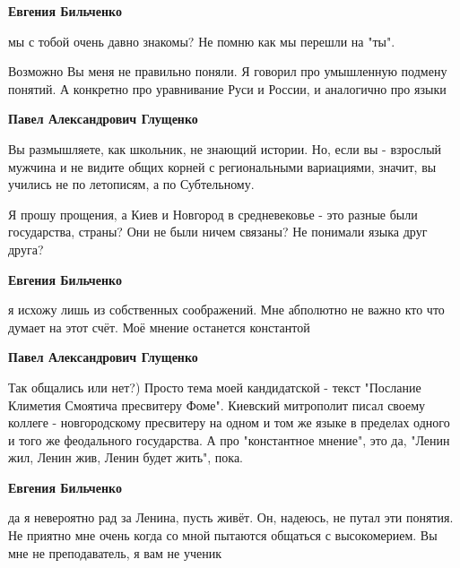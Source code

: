 \begin{itemize}
\begin{itemize}
\textbf{Евгения Бильченко} 

мы с тобой очень давно знакомы? Не помню как мы перешли на "ты".

Возможно Вы меня не правильно поняли. Я говорил про умышленную подмену понятий.
А конкретно про уравнивание Руси и России, и аналогично про языки



\textbf{Павел Александрович Глущенко} 

Вы размышляете, как школьник, не знающий
истории. Но, если вы - взрослый мужчина и не видите общих корней с
региональными вариациями, значит, вы учились не по летописям, а по Субтельному.


Я прошу прощения, а Киев и Новгород в средневековье - это разные были
государства, страны? Они не были ничем связаны? Не понимали языка друг друга?


\textbf{Евгения Бильченко} 

я исхожу лишь из собственных соображений. Мне
абполютно не важно кто что думает на этот счёт. Моё мнение останется константой



\textbf{Павел Александрович Глущенко} 

Так общались или нет?) Просто тема моей кандидатской - текст "Послание Климетия
Смоятича пресвитеру Фоме". Киевский митрополит писал своему коллеге -
новгородскому пресвитеру на одном и том же языке в пределах одного и того же
феодального государства. А про "константное мнение", это да, "Ленин жил, Ленин
жив, Ленин будет жить", пока.



\textbf{Евгения Бильченко} 

да я невероятно рад за Ленина, пусть живёт. Он, надеюсь, не путал эти понятия.
Не приятно мне очень когда со мной пытаются общаться с высокомерием. Вы мне не
преподаватель, я вам не ученик



\end{itemize}
\end{itemize}
